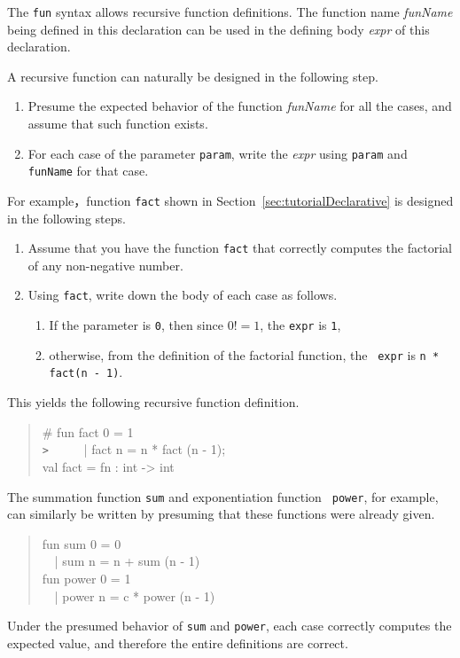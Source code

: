 \documentclass{jbook}
\newenvironment{program}{\begin{quote}\begin{tt}}%
                        {\end{tt}\end{quote}}
\begin{document}
\else%
	The {\tt fun} syntax allows recursive function definitions. 
	The function name {\it funName} being defined in this
declaration can be used in the defining body {\it expr} of this
declaration.

	A recursive function can naturally be designed in the following step.
\begin{enumerate}
\item 
	Presume the expected behavior of the function {\it funName} for
all the cases, and assume that such function exists.
\item 
	For each case of the parameter {\tt param}, write the {\it expr}
using {\tt param} and {\tt funName} for that case.
\end{enumerate}
	For example，function {\tt fact} shown in
Section~\ref{sec:tutorialDeclarative} is designed in the following steps.
\begin{enumerate}
\item Assume that you have the function {\tt fact} that correctly
computes the factorial of any non-negative number.
\item Using {\tt fact}, write down the body of each case as follows.
\begin{enumerate}
\item If the parameter is {\tt 0}, then since $0!=1$, the {\tt expr} is {\tt 1},
\item otherwise, from the definition of the factorial function, the {\tt
expr} is {\tt n * fact(n - 1)}.
\end{enumerate}
\end{enumerate}
	This yields the following recursive function definition.
\begin{program}
\# fun fact 0 = 1\\
\verb|>| \ \ \ \ \ | fact n = n * fact (n - 1);\\
val fact = fn : int -> int
\end{program}

	The summation function {\tt sum} and exponentiation function {\tt
power}, for example, can similarly be written by presuming that these
functions were already given.
\begin{tt}
\begin{quote}
fun sum 0 = 0\\
\ \ | sum n = n + sum (n - 1)\\
fun power 0 = 1\\
\ \ | power n = c * power (n - 1)
\end{quote}
\end{tt}
	Under the presumed behavior of {\tt sum} and {\tt power}, each
case correctly computes the expected value, and therefore the entire
definitions are correct.
\end{document}

